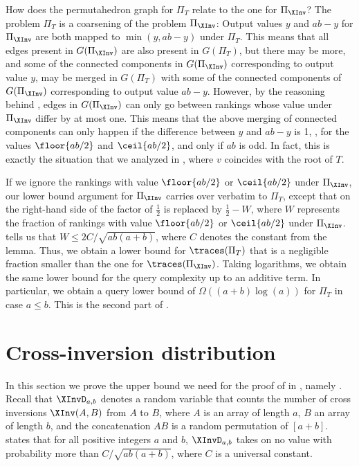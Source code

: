 \documentclass{toc}
\begin{document}
How does the permutahedron graph for $\Pi_T$ relate to the one for $\Pi_{\XInv}$? The problem $\Pi_T$ is a coarsening of the problem $\Pi_{\XInv}$: Output values $y$ and $ab-y$ for $\Pi_{\XInv}$ are both mapped to $\min(y,ab-y)$ under $\Pi_T$. This means that all edges present in $G(\Pi_{\XInv})$ are also present in $G(\Pi_T)$, but there may be more, and some of the connected components in $G(\Pi_{\XInv})$ corresponding to output value $y$, may be merged in $G(\Pi_T)$ with some of the connected components of $G(\Pi_{\XInv})$ corresponding to output value $ab-y$. However, by the reasoning behind , edges in $G(\Pi_{\XInv})$ can only go between rankings whose value under $\Pi_{\XInv}$ differ by at most one. This means that the above merging of connected components can only happen if the difference between $y$ and $ab-y$ is 1, \ie, for the values $\floor{ab/2}$ and $\ceil{ab/2}$, and only if $ab$ is odd. In fact, this is exactly the situation that we analyzed in , where $v$ coincides with the root of $T$. 

If we ignore the rankings with value $\floor{ab/2}$ or $\ceil{ab/2}$ under $\Pi_{\XInv}$, our lower bound argument for $\Pi_{\XInv}$ carries over verbatim to $\Pi_T$, except that on the right-hand side of  the factor of $\frac{1}{2}$ is replaced by $\frac{1}{2}-W$, where $W$ represents the fraction of rankings with value $\floor{ab/2}$ or $\ceil{ab/2}$ under $\Pi_{\XInv}$.  tells us that $W \le 2C/\sqrt{ab(a+b)}$, where $C$ denotes the constant from the lemma. Thus, we obtain a lower bound for $\traces(\Pi_T)$ that is a negligible fraction smaller than the one for $\traces(\Pi_{\XInv})$. Taking logarithms, we obtain the same lower bound for the query complexity up to an additive term. In particular, we obtain a query lower bound of $\Omega((a+b)\log(a))$ for $\Pi_T$ in case $a \le b$. This is the second part of .



\section{Cross-inversion distribution}
\label{sec:cross-inversions}
%
%
%
%

%
%
%
%
%
%
%
%
%

In this section we prove the upper bound we need for the proof of  in , namely . Recall that $\XInvD_{a,b}$ denotes a random variable that counts the number of cross inversions $\XInv(A,B)$ from $A$ to $B$, where $A$ is an array of length $a$, $B$ an array of length $b$, and the concatenation $AB$ is a random permutation of $[a+b]$.
 states that for all positive integers $a$ and $b$, $\XInvD_{a,b}$ takes on no value with probability more than $C/\sqrt{ab(a+b)}$, where $C$ is a universal constant.
\end{document}
